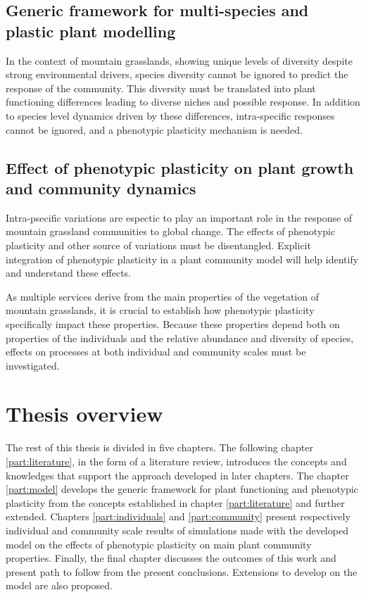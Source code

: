 \subsection{Generic framework for multi-species and plastic plant modelling} %

In the context of mountain grasslands, showing unique levels of diversity despite strong environmental drivers, species diversity cannot be ignored to predict the response of the community. This diversity must be translated into plant functioning differences leading to diverse niches and possible response. In addition to species level dynamics driven by these differences, intra-specific responses cannot be ignored, and a phenotypic plasticity mechanism is needed.




\subsection{Effect of phenotypic plasticity on plant growth and community dynamics}

Intra-psecific variations are espectic to play an important role in the response of mountain grassland communities to global change. The effects of phenotypic plasticity and other source of variations must be disentangled. Explicit integration of phenotypic plasticity in a plant community model will help identify and understand these effects.

As multiple services derive from the main properties of the vegetation of mountain grasslands, it is crucial to establish how phenotypic plasticity specifically impact these properties. Because these properties depend both on properties of the individuals and the relative abundance and diversity of species, effects on processes at both individual and community scales must be investigated.


\section{Thesis overview}

The rest of this thesis is divided in five chapters. The following chapter \ref{part:literature}, in the form of a literature review, introduces the concepts and knowledges that support the approach developed in later chapters. The chapter \ref{part:model} develops the generic framework for plant functioning and phenotypic plasticity from the concepts established in chapter \ref{part:literature} and further extended. Chapters \ref{part:individuals} and \ref{part:community} present respectively individual and community scale results of simulations made with the developed model \model on the effects of phenotypic plasticity on main plant community properties. Finally, the final chapter discusses the outcomes of this work and present path to follow from the present conclusions. Extensions to develop on the model are also proposed.
